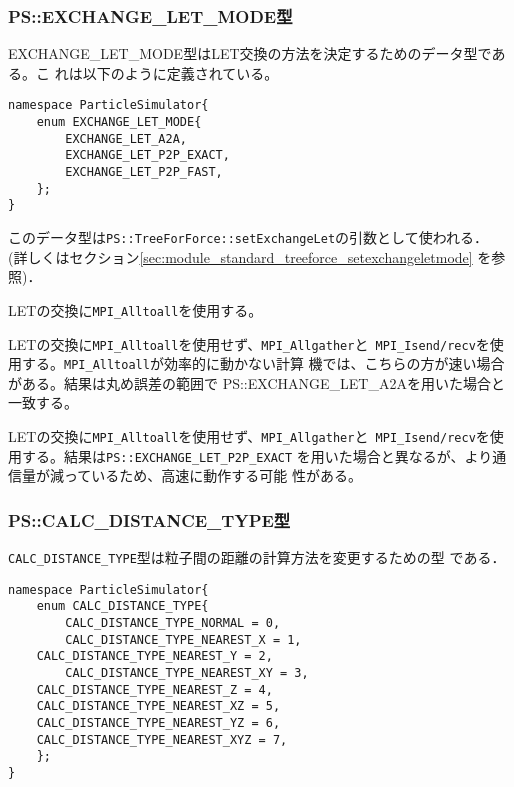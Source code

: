 \subsubsection{PS::EXCHANGE\_LET\_MODE型}
\label{sec:datatype_enum_exchange_let_mode}


EXCHANGE\_LET\_MODE型はLET交換の方法を決定するためのデータ型である。こ
れは以下のように定義されている。

\begin{lstlisting}[caption=EXCHANGE\_LET\_MODE]
namespace ParticleSimulator{
    enum EXCHANGE_LET_MODE{
        EXCHANGE_LET_A2A,
        EXCHANGE_LET_P2P_EXACT,
        EXCHANGE_LET_P2P_FAST,
    };
}
\end{lstlisting}

このデータ型は{\tt PS::TreeForForce::setExchangeLet}の引数として使われる．
(詳しくはセクション\ref{sec:module_standard_treeforce_setexchangeletmode}
を参照)．


LETの交換に{\tt MPI\_Alltoall}を使用する。


LETの交換に{\tt MPI\_Alltoall}を使用せず、{\tt MPI\_Allgather}と{\tt
MPI\_Isend/recv}を使用する。{\tt MPI\_Alltoall}が効率的に動かない計算
機では、こちらの方が速い場合がある。結果は丸め誤差の範囲で
PS::EXCHANGE\_LET\_A2Aを用いた場合と一致する。


LETの交換に{\tt MPI\_Alltoall}を使用せず、{\tt MPI\_Allgather}と{\tt
MPI\_Isend/recv}を使用する。結果は{\tt PS::EXCHANGE\_LET\_P2P\_EXACT}
を用いた場合と異なるが、より通信量が減っているため、高速に動作する可能
性がある。



\subsubsection{PS::CALC\_DISTANCE\_TYPE型}
\label{sec:datatype_enum_calc_distance_type}


{\tt CALC\_DISTANCE\_TYPE}型は粒子間の距離の計算方法を変更するための型
である．

\begin{lstlisting}[caption=CALC\_DISTANCE\_TYPE]
namespace ParticleSimulator{
    enum CALC_DISTANCE_TYPE{
        CALC_DISTANCE_TYPE_NORMAL = 0,
        CALC_DISTANCE_TYPE_NEAREST_X = 1,
	CALC_DISTANCE_TYPE_NEAREST_Y = 2,
        CALC_DISTANCE_TYPE_NEAREST_XY = 3,
	CALC_DISTANCE_TYPE_NEAREST_Z = 4,
	CALC_DISTANCE_TYPE_NEAREST_XZ = 5,
	CALC_DISTANCE_TYPE_NEAREST_YZ = 6,
	CALC_DISTANCE_TYPE_NEAREST_XYZ = 7,
    };
}
\end{lstlisting}


